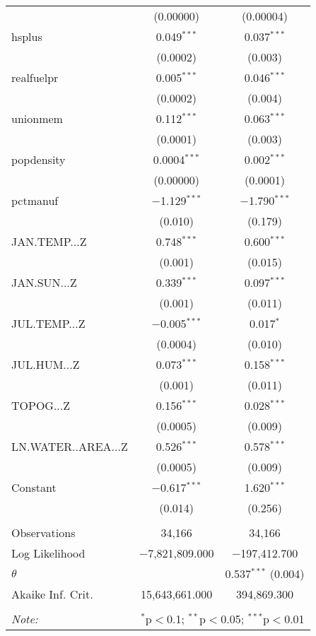 \begin{table}[!htbp]
\begin{tabular}{@{\extracolsep{5pt}}lcc}
  & (0.00000) & (0.00004) \\ 
  hsplus & 0.049$^{***}$ & 0.037$^{***}$ \\ 
  & (0.0002) & (0.003) \\ 
  realfuelpr & 0.005$^{***}$ & 0.046$^{***}$ \\ 
  & (0.0002) & (0.004) \\ 
  unionmem & 0.112$^{***}$ & 0.063$^{***}$ \\ 
  & (0.0001) & (0.003) \\ 
  popdensity & 0.0004$^{***}$ & 0.002$^{***}$ \\ 
  & (0.00000) & (0.0001) \\ 
  pctmanuf & $-$1.129$^{***}$ & $-$1.790$^{***}$ \\ 
  & (0.010) & (0.179) \\ 
  JAN.TEMP...Z & 0.748$^{***}$ & 0.600$^{***}$ \\ 
  & (0.001) & (0.015) \\ 
  JAN.SUN...Z & 0.339$^{***}$ & 0.097$^{***}$ \\ 
  & (0.001) & (0.011) \\ 
  JUL.TEMP...Z & $-$0.005$^{***}$ & 0.017$^{*}$ \\ 
  & (0.0004) & (0.010) \\ 
  JUL.HUM...Z & 0.073$^{***}$ & 0.158$^{***}$ \\ 
  & (0.001) & (0.011) \\ 
  TOPOG...Z & 0.156$^{***}$ & 0.028$^{***}$ \\ 
  & (0.0005) & (0.009) \\ 
  LN.WATER..AREA...Z & 0.526$^{***}$ & 0.578$^{***}$ \\ 
  & (0.0005) & (0.009) \\ 
  Constant & $-$0.617$^{***}$ & 1.620$^{***}$ \\ 
  & (0.014) & (0.256) \\ 
 \hline \\[-1.8ex] 
Observations & 34,166 & 34,166 \\ 
Log Likelihood & $-$7,821,809.000 & $-$197,412.700 \\ 
$\theta$ &  & 0.537$^{***}$  (0.004) \\ 
Akaike Inf. Crit. & 15,643,661.000 & 394,869.300 \\ 
\hline 
\hline \\[-1.8ex] 
\textit{Note:}  & \multicolumn{2}{r}{$^{*}$p$<$0.1; $^{**}$p$<$0.05; $^{***}$p$<$0.01} \\ 
\end{tabular} 
\end{table} 
